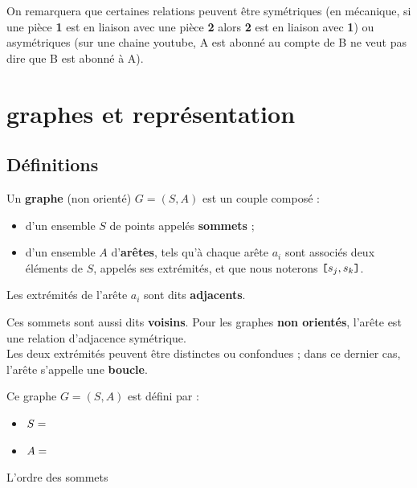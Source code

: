 On remarquera que certaines relations peuvent être symétriques (en mécanique, si une pièce \textbf{1} est en liaison avec une pièce \textbf{2} alors \textbf{2} est en liaison avec \textbf{1}) ou asymétriques (sur une chaine youtube, A est abonné au compte de B ne veut pas dire que B est abonné à A).

\section{graphes et représentation}

\subsection{Définitions}

\begin{defi}
Un \textbf{graphe} (non orienté) $G=(S,A)$ est un couple composé :
\begin{itemize}
\item d'un ensemble $S$ de points appelés \textbf{sommets} ;
\item d'un ensemble $A$ d'\textbf{arêtes}, tels qu'à chaque arête $a_i$ sont associés deux éléments de $S$, appelés ses extrémités, et que nous noterons $\verb![!s_j,s_k\verb!]!$.
\end{itemize}
Les extrémités de l'arête $a_i$ sont dits \textbf{adjacents}.
\end{defi}

\vspace{-0.5cm}
Ces sommets sont aussi dits \textbf{voisins}. Pour les graphes \textbf{non orientés}, l'arête est une relation d'adjacence symétrique.\\
Les deux extrémités peuvent être distinctes ou confondues ; dans ce dernier cas, l'arête s'appelle une \textbf{boucle}.

\vspace{0.3cm}

\begin{minipage}[l]{0.5\linewidth}
\begin{center}
\end{center}
\end{minipage}
\begin{minipage}[l]{0.5\linewidth}
Ce graphe $G=(S,A)$ est défini par :
\begin{itemize}
\item $S=\Cache{\{0,1,2,3,4\}}$
\item $A=\Cache{\{(0,1),(1,2),(2,3),(3,4),(4,0)\}}$
\end{itemize}
L'ordre des sommets
\end{minipage}
\vspace{0.3cm}

